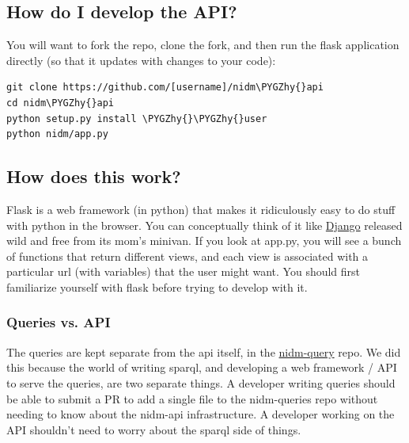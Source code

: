 \documentclass[letterpaper,10pt,english]{sphinxmanual}
\def\PYGZhy{\char`\-}
\begin{document}
\subsection{How do I develop the API?}
\label{development:how-do-i-develop-the-api}
You will want to fork the repo, clone the fork, and then run the flask application directly (so that it updates with changes to your code):

\begin{Verbatim}[commandchars=\\\{\}]
git clone https://github.com/[username]/nidm\PYGZhy{}api
cd nidm\PYGZhy{}api
python setup.py install \PYGZhy{}\PYGZhy{}user
python nidm/app.py
\end{Verbatim}


\subsection{How does this work?}
\label{development:how-does-this-work}
Flask is a web framework (in python) that makes it ridiculously easy to do stuff with python in the browser. You can conceptually think of it like \href{https://www.djangoproject.com/}{Django} released wild and free from its mom's minivan. If you look at app.py, you will see a bunch of functions that return different views, and each view is associated with a particular url (with variables) that the user might want.  You should first familiarize yourself with flask before trying to develop with it.


\subsubsection{Queries vs. API}
\label{development:queries-vs-api}
The queries are kept separate from the api itself, in the \href{https://github.com/incf-nidash/nidm-query}{nidm-query} repo. We did this because the world of writing sparql, and developing a web framework / API to serve the queries, are two separate things. A developer writing queries should be able to submit a PR to add a single file to the nidm-queries repo without needing to know about the nidm-api infrastructure. A developer working on the API shouldn't need to worry about the sparql side of things.
\end{document}
